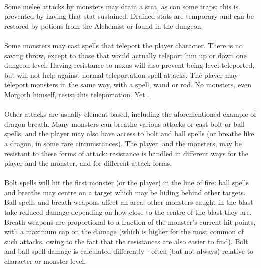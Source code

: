 \paragraph{}Some melee attacks by monsters may drain a stat, as can some traps: this is
prevented by having that stat sustained. Drained stats are temporary and can
be restored by potions from the Alchemist or found in the dungeon.

\paragraph{}Some monsters may cast spells that teleport the player character. There is
no saving throw, except to those that would actually teleport him
up or down one dungeon level. Having resistance to nexus will also prevent
being level-teleported, but will not help against normal teleportation spell
attacks. The player may teleport monsters in the same way, with a spell,
wand or rod. No monsters, even Morgoth himself, resist this teleportation.
Yet...

\paragraph{}Other attacks are usually element-based, including the aforementioned
example of dragon breath. Many monsters can breathe various attacks or
cast bolt or ball spells, and the player may also have access to bolt and
ball spells (or breathe like a dragon, in some rare circumstances). The
player, and the monsters, may be resistant to these forms of attack:
resistance is handled in different ways for the player and the monster,
and for different attack forms.

\paragraph{}Bolt spells will hit the first monster (or the player) in
the line of fire: ball spells and breaths may centre on a target which
may be hiding behind other targets. Ball spells and breath weapons
affect an area: other monsters caught in the blast take reduced damage
depending on how close to the centre of the blast they are. Breath
weapons are proportional to a fraction of the monster's current hit
points, with a maximum cap on the damage (which is higher for the most
common of such attacks, owing to the fact that the resistances are also
easier to find). Bolt and ball spell damage is calculated differently -
often (but not always) relative to character or monster level.

